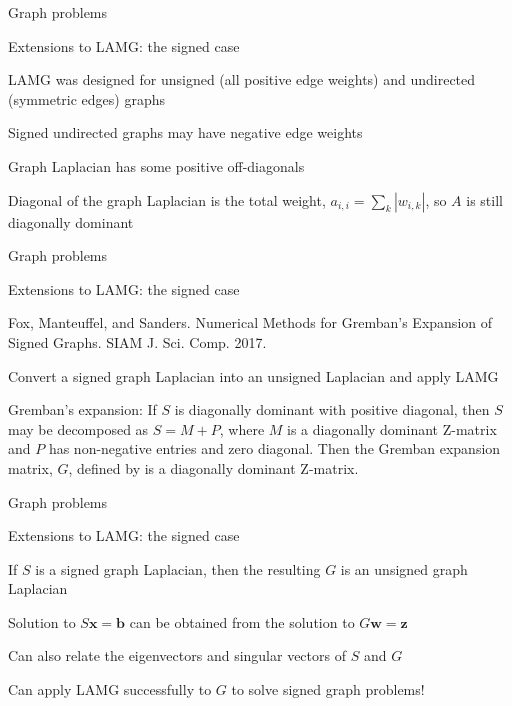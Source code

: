 \documentclass[18pt,xcolor=table]{beamer}
\begin{document}
\begin{frame}{Graph problems}
\begin{block}{Extensions to LAMG: the signed case}
\bit
\item LAMG was designed for unsigned (all positive edge weights) and undirected (symmetric edges) graphs
\item Signed undirected graphs may have negative edge weights
\item Graph Laplacian has some positive off-diagonals 
\item Diagonal of the graph Laplacian is the total weight, $a_{i,i} = \sum_k |w_{i,k}|$, so $A$ is still diagonally dominant
\eit
\end{block}
\end{frame}

\begin{frame}{Graph problems}
\begin{block}{Extensions to LAMG: the signed case}
\bit
\item Fox, Manteuffel, and Sanders. Numerical Methods for Gremban's Expansion of Signed Graphs. SIAM J. Sci. Comp. 2017.
\item Convert a signed graph Laplacian into an unsigned Laplacian and apply LAMG
\item Gremban's expansion: If $S$ is diagonally dominant with positive diagonal, then $S$ may be decomposed as $S = M + P$, where $M$ is a diagonally dominant Z-matrix and $P$ has non-negative entries and zero diagonal. Then the Gremban expansion matrix, $G$, defined by
is a diagonally dominant Z-matrix.
\eit
\end{block}
\end{frame}

\begin{frame}{Graph problems}
\begin{block}{Extensions to LAMG: the signed case}
\bit
\item If $S$ is a signed graph Laplacian, then the resulting $G$ is an unsigned graph Laplacian
\item Solution to $S\mathbf{x} = \mathbf{b}$ can be obtained from the solution to $G\mathbf{w} = \mathbf{z}$
\item Can also relate the eigenvectors and singular vectors of $S$ and $G$
\item Can apply LAMG successfully to $G$ to solve signed graph problems!
\eit
\end{block}
\end{frame}
\end{document}
